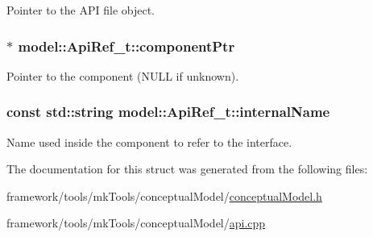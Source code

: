 Pointer to the A\+PI file object. 

\subsubsection[{\texorpdfstring{component\+Ptr}{componentPtr}}]{$\ast$ model\+::\+Api\+Ref\+\_\+t\+::component\+Ptr}\hypertarget{structmodel_1_1_api_ref__t_a997ab1c73412c93649b9f41a04c28440}{}\label{structmodel_1_1_api_ref__t_a997ab1c73412c93649b9f41a04c28440}


Pointer to the component (N\+U\+LL if unknown). 

\subsubsection[{\texorpdfstring{internal\+Name}{internalName}}]{\setlength{\rightskip}{0pt plus 5cm}const std\+::string model\+::\+Api\+Ref\+\_\+t\+::internal\+Name}\hypertarget{structmodel_1_1_api_ref__t_a766cd20fe8143a20495c7a7efb9bc4c9}{}\label{structmodel_1_1_api_ref__t_a766cd20fe8143a20495c7a7efb9bc4c9}


Name used inside the component to refer to the interface. 



The documentation for this struct was generated from the following files\+:\begin{DoxyCompactItemize}
\item 
framework/tools/mk\+Tools/conceptual\+Model/\hyperlink{conceptual_model_8h}{conceptual\+Model.\+h}\item 
framework/tools/mk\+Tools/conceptual\+Model/\hyperlink{api_8cpp}{api.\+cpp}\end{DoxyCompactItemize}
